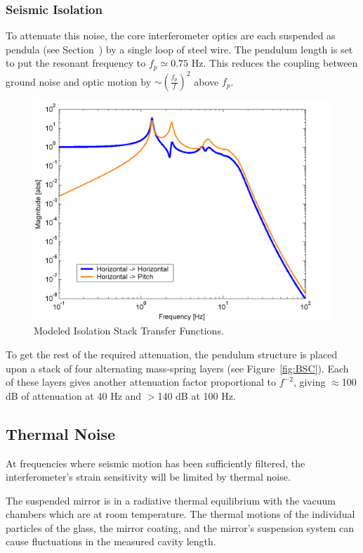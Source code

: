 \subsubsection{Seismic Isolation}
To attenuate this noise, the core interferometer optics are each suspended
as pendula (see Section~\cite{sec:SUS}) by a single loop of steel wire. 
The pendulum length is set to put the resonant frequency 
to $f_{p} \simeq 0.75$ Hz. 
This reduces the coupling between ground noise and optic motion by 
$\sim(\frac{f_{p}}{f})^{2}$ above $f_p$.
\begin{figure}[!h]
\centerline{
\includegraphics[angle=0,width=6.5in]{Figures/Chap4/BSCtf2.png}}
\caption[BSC Stack Transfer Function]{Modeled Isolation Stack Transfer Functions.}
\label{fig:StackTF}
\end{figure}
To get the rest of the required attenuation, the pendulum structure is placed upon
a stack of four alternating mass-spring layers (see Figure~\ref{fig:BSC}). Each of 
these layers gives another attenuation
factor proportional to $f^{-2}$, giving $\approx$100 dB of attenuation at 40 Hz and 
$>$140 dB at 100 Hz\cite{Giaime:ShitStack}.


\subsection{Thermal Noise}

At frequencies where seismic motion has been sufficiently filtered, the
interferometer's strain sensitivity will be limited by thermal noise.

The suspended mirror is in a radiative thermal equilibrium with the vacuum
chambers which are at room temperature. The thermal motions of the individual
particles of the glass, the mirror coating, and the mirror's suspension system
can cause fluctuations in the measured cavity length.

